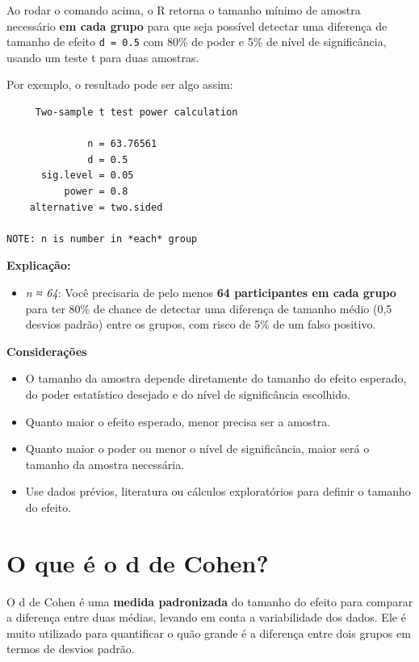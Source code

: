 \documentclass[
]{book}
\providecommand{\tightlist}{%
  \setlength{\itemsep}{0pt}\setlength{\parskip}{0pt}}
\begin{document}
Ao rodar o comando acima, o R retorna o tamanho mínimo de amostra necessário \textbf{em cada grupo} para que seja possível detectar uma diferença de tamanho de efeito \texttt{d\ =\ 0.5} com 80\% de poder e 5\% de nível de significância, usando um teste t para duas amostras.

Por exemplo, o resultado pode ser algo assim:

\begin{verbatim}
     Two-sample t test power calculation 

              n = 63.76561
              d = 0.5
      sig.level = 0.05
          power = 0.8
    alternative = two.sided

NOTE: n is number in *each* group
\end{verbatim}

\textbf{Explicação:}

\begin{itemize}
\tightlist
\item
  \emph{n ≈ 64}: Você precisaria de pelo menos \textbf{64 participantes em cada grupo} para ter 80\% de chance de detectar uma diferença de tamanho médio (0,5 desvios padrão) entre os grupos, com risco de 5\% de um falso positivo.
\end{itemize}

\textbf{Considerações}

\begin{itemize}
\tightlist
\item
  O tamanho da amostra depende diretamente do tamanho do efeito esperado, do poder estatístico desejado e do nível de significância escolhido.
\item
  Quanto maior o efeito esperado, menor precisa ser a amostra.
\item
  Quanto maior o poder ou menor o nível de significância, maior será o tamanho da amostra necessária.
\item
  Use dados prévios, literatura ou cálculos exploratórios para definir o tamanho do efeito.
\end{itemize}

\section{O que é o d de Cohen?}\label{o-que-uxe9-o-d-de-cohen}

O d de Cohen é uma \textbf{medida padronizada} do tamanho do efeito para comparar a diferença entre duas médias, levando em conta a variabilidade dos dados. Ele é muito utilizado para quantificar o quão grande é a diferença entre dois grupos em termos de desvios padrão.
\end{document}
